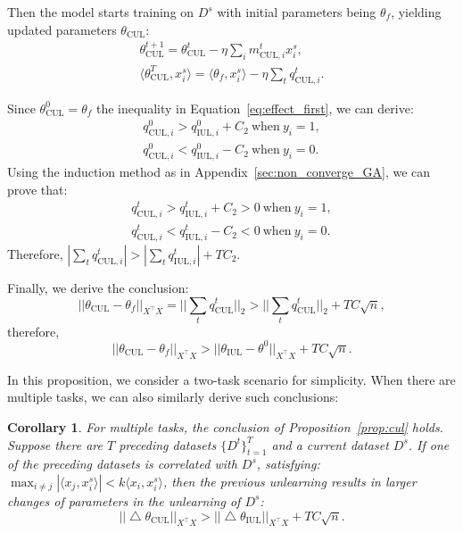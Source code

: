\documentclass{article}
\theoremstyle{plain}
\newtheorem{corollary}[theorem]{Corollary}
\theoremstyle{definition}
\theoremstyle{remark}
\begin{document}
Then the model starts training on $D^s$ with initial parameters being $\theta_f$, yielding updated parameters $\theta_{\text{CUL}}$:
\begin{equation}
\begin{aligned}
\theta_\text{CUL}^{t+1}=\theta_\text{CUL}^{t}-\eta \sum_i m_{\text{CUL},i}^t x^s_i,\\
\langle\theta_\text{CUL}^{T}, x^s_i\rangle=\langle\theta_{f},x_i^s\rangle-\eta \sum_t q_{\text{CUL},i}^t.
\end{aligned}
\end{equation}

Since $\theta_\text{CUL}^{0}=\theta_f$ the inequality in Equation~\ref{eq:effect_first}, we can derive:
\begin{equation}
\begin{aligned}
    q_{\text{CUL},i}^0>q_{\text{IUL},i}^0+C_2~\text{when}~y_i=1,\\
    q_{\text{CUL},i}^0<q_{\text{IUL},i}^0-C_2~\text{when}~y_i=0.
\end{aligned}
\end{equation}
Using the induction method as in Appendix~\ref{sec:non_converge_GA}, we can prove that:
\begin{equation}
\begin{aligned}
    q_{\text{CUL},i}^t>q_{\text{IUL},i}^t+C_2>0~\text{when}~y_i=1,\\
    q_{\text{CUL},i}^t<q_{\text{IUL},i}^t-C_2<0~\text{when}~y_i=0.
\end{aligned}
\end{equation}
Therefore, $|\sum_t q_{\text{CUL},i}^t|>|\sum_t q_{\text{IUL},i}^t|+TC_2$.

Finally, we derive the conclusion:
\begin{equation}
    ||\theta_\text{CUL}-\theta_f||_{X^\top X}=||\sum_t q_{\text{CUL}}^t||_2>||\sum_t q_{\text{CUL}}^t||_2+TC\sqrt{n},
\end{equation}
therefore,
\begin{equation}
    ||\theta_\text{CUL}-\theta_f||_{X^\top X}>||\theta_\text{IUL}-\theta^0||_{X^\top X}+TC\sqrt{n}.
\end{equation}

In this proposition, we consider a two-task scenario for simplicity. When there are multiple tasks, we can also similarly derive such conclusions:
\begin{corollary}
For multiple tasks, the conclusion of Proposition~\ref{prop:cul} holds. Suppose there are $T$ preceding datasets $\{D^t\}_{t=1}^T$ and a current dataset $D^s$. If one of the preceding datasets is correlated with $D^s$, satisfying: $\max_{i\neq j}|\langle x_j,x^s_i\rangle|<k\langle x_i,x^s_i\rangle$, then the previous unlearning results in larger changes of parameters in the unlearning of $D^s$:
\begin{equation}
    ||\bigtriangleup\theta_\text{CUL}||_{X^\top X}>||\bigtriangleup\theta_\text{IUL}||_{X^\top X}+TC\sqrt{n}.
\end{equation}
\end{corollary}
\end{document}
